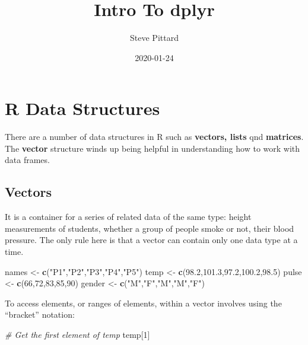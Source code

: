 \documentclass[]{book}
\title{Intro To dplyr}
\author{Steve Pittard}
\date{2020-01-24}
\newenvironment{Shaded}{\begin{snugshade}}{\end{snugshade}}
\newcommand{\CommentTok}[1]{\textcolor[rgb]{0.56,0.35,0.01}{\textit{#1}}}
\newcommand{\DecValTok}[1]{\textcolor[rgb]{0.00,0.00,0.81}{#1}}
\newcommand{\FloatTok}[1]{\textcolor[rgb]{0.00,0.00,0.81}{#1}}
\newcommand{\KeywordTok}[1]{\textcolor[rgb]{0.13,0.29,0.53}{\textbf{#1}}}
\newcommand{\NormalTok}[1]{#1}
\newcommand{\StringTok}[1]{\textcolor[rgb]{0.31,0.60,0.02}{#1}}
\begin{document}
\maketitle

{
\setcounter{tocdepth}{1}
\tableofcontents
}
\hypertarget{r-data-structures}{%
\chapter{R Data Structures}\label{r-data-structures}}

There are a number of data structures in R such as \textbf{vectors, lists} qnd \textbf{matrices}. The \textbf{vector} structure winds up being helpful in understanding how to work with data frames.

\hypertarget{vectors}{%
\section{Vectors}\label{vectors}}

It is a container for a series of related data of the same type: height measurements of students, whether a group of people smoke or not, their blood pressure. The only rule here is that a vector can contain only one data type at a time.

\begin{Shaded}
\begin{Highlighting}[]
\NormalTok{names  <-}\StringTok{ }\KeywordTok{c}\NormalTok{(}\StringTok{"P1"}\NormalTok{,}\StringTok{"P2"}\NormalTok{,}\StringTok{"P3"}\NormalTok{,}\StringTok{"P4"}\NormalTok{,}\StringTok{"P5"}\NormalTok{)}
\NormalTok{temp   <-}\StringTok{ }\KeywordTok{c}\NormalTok{(}\FloatTok{98.2}\NormalTok{,}\FloatTok{101.3}\NormalTok{,}\FloatTok{97.2}\NormalTok{,}\FloatTok{100.2}\NormalTok{,}\FloatTok{98.5}\NormalTok{)}
\NormalTok{pulse  <-}\StringTok{ }\KeywordTok{c}\NormalTok{(}\DecValTok{66}\NormalTok{,}\DecValTok{72}\NormalTok{,}\DecValTok{83}\NormalTok{,}\DecValTok{85}\NormalTok{,}\DecValTok{90}\NormalTok{)}
\NormalTok{gender <-}\StringTok{ }\KeywordTok{c}\NormalTok{(}\StringTok{"M"}\NormalTok{,}\StringTok{"F"}\NormalTok{,}\StringTok{"M"}\NormalTok{,}\StringTok{"M"}\NormalTok{,}\StringTok{"F"}\NormalTok{)}
\end{Highlighting}
\end{Shaded}

To access elements, or ranges of elements, within a vector involves using the ``bracket'' notation:

\begin{Shaded}
\begin{Highlighting}[]
\CommentTok{# Get the first element of temp}
\NormalTok{temp[}\DecValTok{1}\NormalTok{]}
\end{Highlighting}
\end{Shaded}
\end{document}
